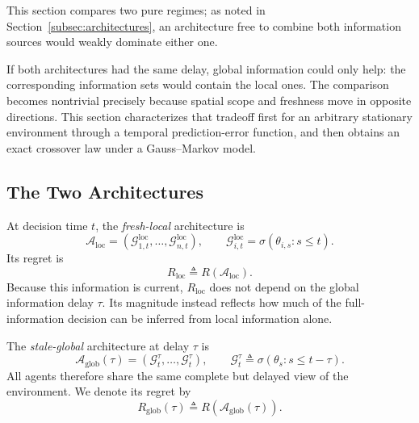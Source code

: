 \documentclass[11pt]{article}
\begin{document}
This section compares two pure regimes; as noted in
Section~\ref{subsec:architectures}, an architecture free to combine both
information sources would weakly dominate either one.

If both architectures had the same delay, global information could only help:
the corresponding information sets would contain the local ones. The
comparison becomes nontrivial precisely because spatial scope and freshness
move in opposite directions. This section characterizes that tradeoff first
for an arbitrary stationary environment through a temporal prediction-error
function, and then obtains an exact crossover law under a Gauss--Markov model.

\subsection{The Two Architectures}
\label{subsec:two_architectures}

At decision time $t$, the \emph{fresh-local} architecture is
\begin{equation}
    \mathcal{A}_{\mathrm{loc}}
    =
    \left(
        \mathcal{G}^{\mathrm{loc}}_{1,t},
        \ldots,
        \mathcal{G}^{\mathrm{loc}}_{n,t}
    \right),
    \qquad
    \mathcal{G}^{\mathrm{loc}}_{i,t}
    =
    \sigma\!\left(
        \theta_{i,s}:s\le t
    \right).
    \label{eq:sec3_local_arch}
\end{equation}
Its regret is
\begin{equation}
    R_{\mathrm{loc}}
    \triangleq
    R(\mathcal{A}_{\mathrm{loc}}).
    \label{eq:Rloc}
\end{equation}
Because this information is current, $R_{\mathrm{loc}}$ does not depend on
the global information delay $\tau$. Its magnitude instead reflects how much
of the full-information decision can be inferred from local information alone.

The \emph{stale-global} architecture at delay $\tau$ is
\begin{equation}
    \mathcal{A}_{\mathrm{glob}}(\tau)
    =
    \left(
        \mathcal{G}^{\tau}_t,\ldots,\mathcal{G}^{\tau}_t
    \right),
    \qquad
    \mathcal{G}^{\tau}_t
    \triangleq
    \sigma\!\left(
        \theta_s:s\le t-\tau
    \right).
    \label{eq:sec3_global_arch}
\end{equation}
All agents therefore share the same complete but delayed view of the
environment. We denote its regret by
\begin{equation}
    R_{\mathrm{glob}}(\tau)
    \triangleq
    R(\mathcal{A}_{\mathrm{glob}}(\tau)).
    \label{eq:Rglob}
\end{equation}
\end{document}
